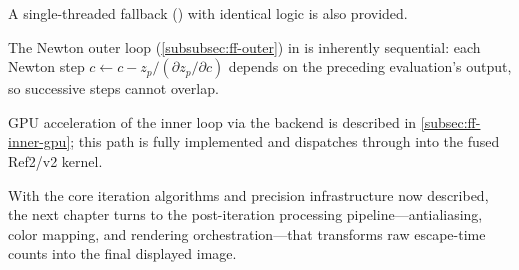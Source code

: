 A single-threaded fallback () with
identical logic is also provided.

The Newton outer loop (\cref{subsubsec:ff-outer}) in
 is inherently sequential: each Newton step
$c \leftarrow c - z_p / (\partial z_p / \partial c)$ depends on the
preceding evaluation's output, so successive steps cannot overlap.

GPU acceleration of the inner loop via the  backend
is described in \cref{subsec:ff-inner-gpu}; this path is fully
implemented and dispatches through  into the
fused Ref2/v2 kernel.

With the core iteration algorithms and precision infrastructure now
described, the next chapter turns to the post-iteration processing
pipeline---antialiasing, color mapping, and rendering orchestration---that
transforms raw escape-time counts into the final displayed image.
